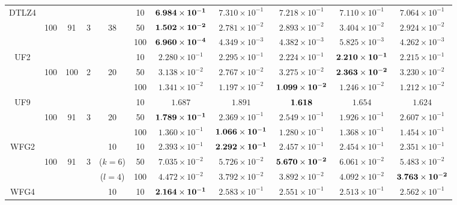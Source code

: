 \documentclass[../main/main]{subfiles}
\begin{document}
\begin{table}[htbp]
\begin{tabular}{c|ccccc|c|c|c|c|c}
\hline
\multirow{3}{*}{DTLZ4} &        &     &&  & 10 &$\bf{6.984 \times 10^{-1}}$ & $7.310 \times 10^{-1}$ & $7.218 \times 10^{-1}$ & $7.110 \times 10^{-1}$ & $7.064 \times 10^{-1}$\\
  				   & 100 & 91 & 3&38& 50 &$\bf{1.502 \times 10^{-2}}$ & $2.781 \times 10^{-2}$ & $2.893 \times 10^{-2}$ & $3.404 \times 10^{-2}$ & $2.924 \times 10^{-2}$\\
				   &        &     &&   &100 &$\bf{6.960 \times 10^{-4}}$ & $4.349 \times 10^{-3}$ & $4.382 \times 10^{-3}$ & $5.825 \times 10^{-3}$ & $4.262 \times 10^{-3}$\\
\hline
\multirow{3}{*}{UF2} &        &    &&   & 10 &$2.280 \times 10^{-1}$ & $2.295 \times 10^{-1}$ & $2.224 \times 10^{-1}$ & $\bf{2.210 \times 10^{-1}}$ & $2.215 \times 10^{-1}$\\
  				   & 100 & 100 & 2 & 20 & 50 &$3.138 \times 10^{-2}$ & $2.767 \times 10^{-2}$ & $3.275 \times 10^{-2}$ & $\bf{2.363 \times 10^{-2}}$ & $3.230 \times 10^{-2}$\\
				   &        &      &&  &100 & $1.341 \times 10^{-2}$ & $1.197 \times 10^{-2}$ & $\bf{1.099 \times 10^{-2}}$ & $1.246 \times 10^{-2}$ & $1.212 \times 10^{-2}$\\
\hline
\multirow{3}{*}{UF9} &        &    &&        & 10 &$1.687$ & $1.891$ & $\bf{1.618}$ & $1.654$ & $1.624$\\
  				   &100 & 91 & 3 & 20 & 50 &$\bf{1.789 \times 10^{-1}}$ & $2.369 \times 10^{-1}$ & $2.549 \times 10^{-1}$ & $1.926 \times 10^{-1}$ & $2.607 \times 10^{-1}$\\
				   &        &     &&   &100 &$1.360 \times 10^{-1}$ & $\bf{1.066 \times 10^{-1}}$ & $1.280 \times 10^{-1}$ & $1.368 \times 10^{-1}$ & $1.454 \times 10^{-1}$\\
\hline
\multirow{3}{*}{WFG2} &        &   &&  10  & 10 &$2.393 \times 10^{-1}$ & $\bf{2.292 \times 10^{-1}}$ & $2.457 \times 10^{-1}$ & $2.454 \times 10^{-1}$ & $2.351 \times 10^{-1}$\\
  				   & 100 & 91 & 3 & ($k=6$) &50 &$7.035 \times 10^{-2}$ & $5.726 \times 10^{-2}$ & $\bf{5.670 \times 10^{-2}}$ & $6.061 \times 10^{-2}$ & $5.483 \times 10^{-2}$\\
				   &        &      && ($l=4$) &100 &$4.472 \times 10^{-2}$ & $3.792 \times 10^{-2}$ & $3.892 \times 10^{-2}$ & $4.092 \times 10^{-2}$ & $\bf{3.763 \times 10^{-2}}$\\
\hline
\multirow{3}{*}{WFG4} &        &   &&  10  & 10 &$\bf{2.164 \times 10^{-1}}$ & $2.583 \times 10^{-1}$ & $2.551 \times 10^{-1}$ & $2.513 \times 10^{-1}$ & $2.562 \times 10^{-1}$\\

\end{tabular}
\end{table}
\end{document}
